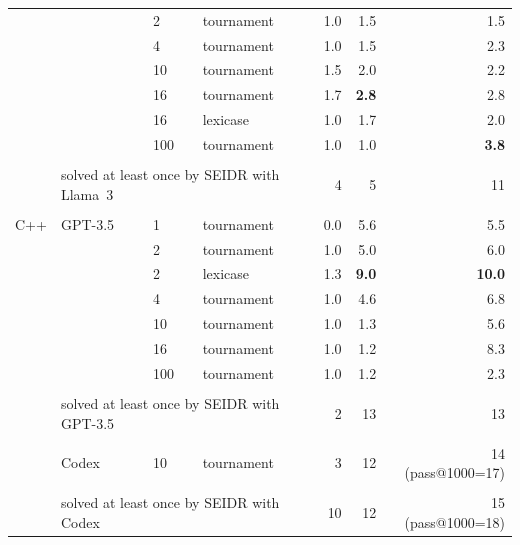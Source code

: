 \begin{table}[t]
\begin{tabular}{llllrrr}
        &        & 2   &         tournament &     1.0 &      1.5 &       1.5 \\
        &        & 4   &         tournament &     1.0 &      1.5 &       2.3 \\
        &        & 10  &         tournament &     1.5 &      2.0 &       2.2 \\
        &        & 16  &         tournament &     1.7 &      \textbf{2.8} &       2.8 \\
        &        & 16  &           lexicase &     1.0 &      1.7 &       2.0 \\
        &        & 100 &         tournament &     1.0 &      1.0 &       \textbf{3.8} \\[1pt]
\cline{3-7}\\[-8pt]
    &  \multicolumn{3}{l}{solved at least once by SEIDR with Llama~3} &   4 &        5 &       11 \\
\midrule\\[-8pt]
 C++ & GPT-3.5 & 1   &         tournament &     0.0 &      5.6 &       5.5 \\
       &        & 2   &         tournament &     1.0 &      5.0 &       6.0 \\
       &        & 2   &           lexicase &     1.3 &     \textbf{ 9.0} &      \textbf{10.0} \\
       &        & 4   &         tournament &     1.0 &      4.6 &       6.8 \\
       &        & 10  &         tournament &     1.0 &      1.3 &       5.6 \\
       &        & 16  &         tournament &     1.0 &      1.2 &       8.3 \\
       &        & 100 &         tournament &     1.0 &      1.2 &       2.3 \\[1pt]
\cline{3-7}\\[-8pt]
       & \multicolumn{3}{l}{solved at least once by SEIDR with GPT-3.5}   & 2 &       13 &       13 \\[1pt]
% 
\cline{2-7}\\[-8pt]
   & Codex  & 10 & tournament &     3 &       12 &   14 (pass@1000=17)\\[1pt]
\cline{3-7}\\[-8pt]
       & \multicolumn{3}{l}{solved at least once by SEIDR with Codex}   & 10 &       12 &        15 (pass@1000=18) \\[1pt]

\end{tabular}
\end{table}
